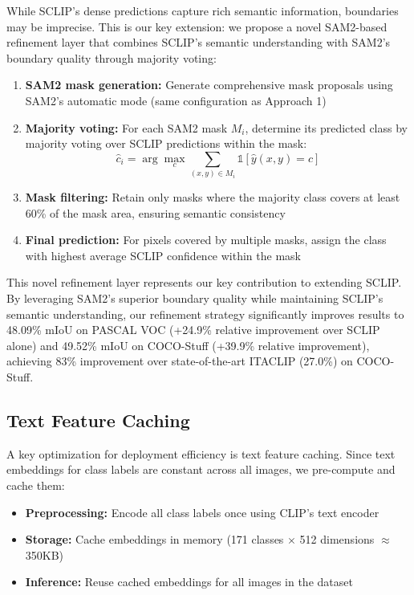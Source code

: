 While SCLIP's dense predictions capture rich semantic information, boundaries may be imprecise. This is our key extension: we propose a novel SAM2-based refinement layer that combines SCLIP's semantic understanding with SAM2's boundary quality through majority voting:

\begin{enumerate}
    \item \textbf{SAM2 mask generation:} Generate comprehensive mask proposals using SAM2's automatic mode (same configuration as Approach 1)

    \item \textbf{Majority voting:} For each SAM2 mask $M_i$, determine its predicted class by majority voting over SCLIP predictions within the mask:
    \begin{equation}
    \hat{c}_i = \arg\max_c \sum_{(x,y) \in M_i} \mathbb{1}[\hat{y}(x,y) = c]
    \end{equation}

    \item \textbf{Mask filtering:} Retain only masks where the majority class covers at least 60\% of the mask area, ensuring semantic consistency

    \item \textbf{Final prediction:} For pixels covered by multiple masks, assign the class with highest average SCLIP confidence within the mask
\end{enumerate}

This novel refinement layer represents our key contribution to extending SCLIP. By leveraging SAM2's superior boundary quality while maintaining SCLIP's semantic understanding, our refinement strategy significantly improves results to 48.09\% mIoU on PASCAL VOC (+24.9\% relative improvement over SCLIP alone) and 49.52\% mIoU on COCO-Stuff (+39.9\% relative improvement), achieving 83\% improvement over state-of-the-art ITACLIP (27.0\%) on COCO-Stuff.

\subsection{Text Feature Caching}

A key optimization for deployment efficiency is text feature caching. Since text embeddings for class labels are constant across all images, we pre-compute and cache them:

\begin{itemize}
    \item \textbf{Preprocessing:} Encode all class labels once using CLIP's text encoder
    \item \textbf{Storage:} Cache embeddings in memory (171 classes $\times$ 512 dimensions $\approx$ 350KB)
    \item \textbf{Inference:} Reuse cached embeddings for all images in the dataset
\end{itemize}

